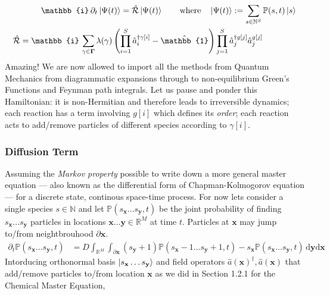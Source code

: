 \documentclass{article}[12pt]
\numberwithin{equation}{section}
\begin{document}
\begin{align}
	\mathbb{i}\,\partial_t\ket{\Psi(t)}
	=\hat{\mathcal{R}}\ket{\Psi(t)}
	\qquad\text{where}\quad
	\ket{\Psi(t)}:=\sum_{s\in\mathbb{N}^S}\mathbb{P}(s,t)\ket{s}
	\label{eq:reactionschrodinger}
\\
	\hat{\mathcal{R}} = \mathbb{i}\,
	\sum_{\gamma\in\mathbf{\Gamma}}
		\lambda(\gamma)
		\left(
			\prod_{i=1}^S\hat{a}_i^{\dagger\gamma[i]}
			-
			\hat{\mathbb{1}}
		\right)
		\prod_{j=1}^S
			\hat{a}_j^{\dagger g[j]}
			\hat{a}_j^{g[j]}
	\qquad\qquad
	\label{eq:reactionhamiltonian}
\end{align}
Amazing! We are now allowed to import all the methods from Quantum Mechanics from
diagrammatic expansions through to non-equilibrium Green's Functions and Feynman
path integrals. Let us pause and ponder this Hamiltonian: it is non-Hermitian and
therefore leads to irreversible dynamics; each reaction has a term involving
$g[i]$ which defines its \textit{order}; each reaction acts to add/remove particles
of different species according to $\gamma[i]$.
\vspace{-10pt}\subsubsection{Diffusion Term}\vspace{-10pt}
Assuming the \textit{Markov property} possible to write down a more general master
equation --- also known as the differential form of Chapman-Kolmogorov equation ---
for a discrete state, continous space-time process. For now lets consider a single
species $s\in\mathbb{N}$ and let $\mathbb{P}(s_{\mathbf{x}}\dots s_{\mathbf{y}},t)$
be the joint probability of finding $s_{\mathbf{x}}\dots s_{\mathbf{y}}$
particles in locations $\mathbf{x}\dots\mathbf{y}\in\mathbb{R}^M$ at time $t$.
Particles at $\mathbf{x}$ may jump to/from neightbrouhood $\partial\mathbf{x}$.
\begin{align}
	\partial_t \mathbb{P}(s_{\mathbf{x}}\dots s_{\mathbf{y}},t) &=
	D\int_{\mathbb{R}^{M}}\int_{\partial\mathbf{x}}\!
	(s_{\mathbf{y}}+1)\mathbb{P}(s_{\mathbf{x}}-1\dots s_{\mathbf{y}}+1,t)
	-
	s_{\mathbf{x}}\mathbb{P}(s_{\mathbf{x}}\dots s_{\mathbf{y}},t)
	\,\mathrm{d}\mathbf{y}\mathrm{d}\mathbf{x}
\end{align}
Intorducing orthonormal basis $\ket{s_{\mathbf{x}}\dots s_{\mathbf{y}}}$ and field
operators $\hat{a}(\mathbf{x})^{\dagger},\hat{a}(\mathbf{x})$ that add/remove particles
to/from location $\mathbf{x}$ as we did in Section 1.2.1 for the Chemical Master Equation,
\end{document}
